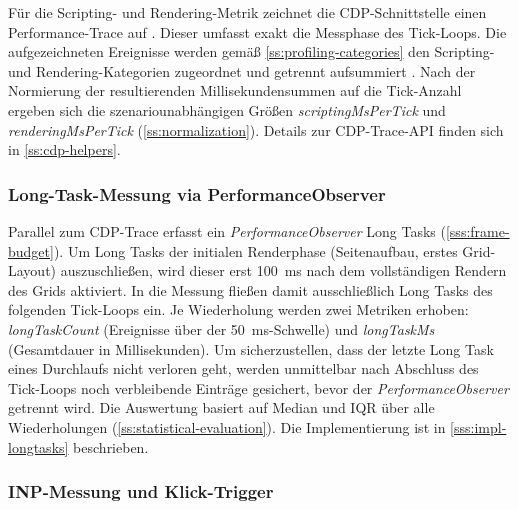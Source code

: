 Für die Scripting- und Rendering-Metrik zeichnet die CDP-Schnittstelle einen Performance-Trace auf \cite{chrome-devtools-tracing}. Dieser umfasst exakt die Messphase des Tick-Loops. Die aufgezeichneten Ereignisse werden gemäß \cref{ss:profiling-categories} den Scripting- und Rendering-Kategorien zugeordnet und getrennt aufsummiert \cite{kearney-timeline-2015}. Nach der Normierung der resultierenden Millisekundensummen auf die Tick-Anzahl ergeben sich die szenariounabhängigen Größen \textit{scriptingMsPerTick} und \textit{renderingMsPerTick} (\cref{ss:normalization}). Details zur CDP-Trace-API finden sich in \cref{ss:cdp-helpers}.

\subsubsection{Long-Task-Messung via PerformanceObserver}
\label{sss:long-task-measurement}

Parallel zum CDP-Trace erfasst ein \textit{PerformanceObserver} Long Tasks (\cref{sss:frame-budget}). Um Long Tasks der initialen Renderphase (Seitenaufbau, erstes Grid-Layout) auszuschließen, wird dieser erst \qty{100}{ms} nach dem vollständigen Rendern des Grids aktiviert. In die Messung fließen damit ausschließlich Long Tasks des folgenden Tick-Loops ein. Je Wiederholung werden zwei Metriken erhoben: \textit{longTaskCount} (Ereignisse über der \qty{50}{ms}-Schwelle) und \textit{longTaskMs} (Gesamtdauer in Millisekunden). Um sicherzustellen, dass der letzte Long Task eines Durchlaufs nicht verloren geht, werden unmittelbar nach Abschluss des Tick-Loops noch verbleibende Einträge gesichert, bevor der \textit{PerformanceObserver} getrennt wird. Die Auswertung basiert auf Median und IQR über alle Wiederholungen (\cref{ss:statistical-evaluation}). Die Implementierung ist in \cref{sss:impl-longtasks} beschrieben.

\subsubsection{INP-Messung und Klick-Trigger}
\label{sss:inp-trigger}

